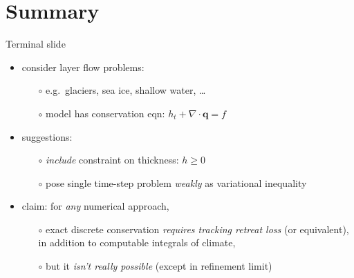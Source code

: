 \documentclass{beamer}
\newcommand\bq{\mathbf{q}}
\newcommand{\Div}{\nabla\cdot}
\begin{document}
\section*{Summary}

\begin{frame}{Terminal slide}

  \begin{itemize}
  \item consider layer flow problems:
    \begin{itemize}
    \item[$\circ$]  e.g.~glaciers, sea ice, shallow water, \dots
    \item[$\circ$]  model has conservation eqn: $h_t + \Div\bq = f$
    \end{itemize}
  \item<2-> suggestions:  
    \begin{itemize}
    \item[$\circ$]  \emph{include} constraint on thickness: $h\ge 0$
    \item[$\circ$]  pose single time-step problem \emph{weakly} as variational inequality
    \end{itemize}
  \item<3> claim:  for \emph{any} numerical approach,
    \begin{itemize}
    \item[$\circ$]  exact discrete conservation \emph{requires tracking retreat loss} (or equivalent), in addition to computable integrals of climate,
    \item[$\circ$]  but it \emph{isn't really possible} (except in refinement limit)
    \end{itemize}
  \end{itemize}

\end{frame}
\end{document}

